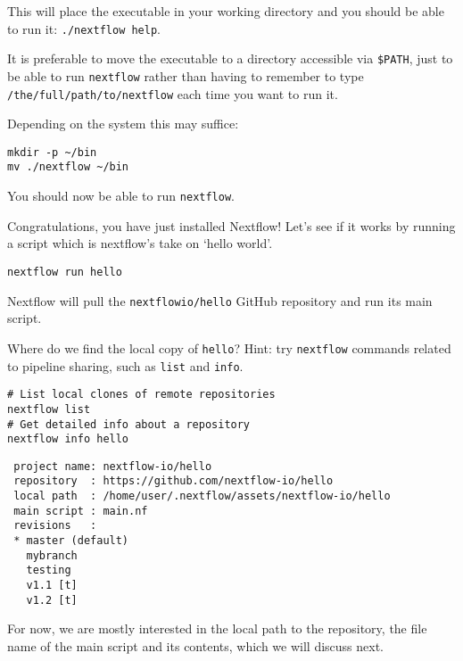 This will place the executable in your working directory and you should be able to run it: \texttt{./nextflow help}.

It is preferable to move the executable to a directory accessible via \texttt{\$PATH}, just to be able to run \texttt{nextflow} rather than having to remember to type \texttt{/the/full/path/to/nextflow} each time you want to run it.

Depending on the system this may suffice:



\begin{steps}
\begin{lstlisting}
mkdir -p ~/bin
mv ./nextflow ~/bin
\end{lstlisting}
\end{steps}

You should now be able to run \texttt{nextflow}.

Congratulations, you have just installed Nextflow! 
Let's see if it works by running a script which is nextflow's take on `hello world'.

\begin{steps}
\begin{lstlisting}
nextflow run hello
\end{lstlisting}
\end{steps}

Nextflow will pull the \texttt{nextflowio/hello} GitHub repository and run its main script.


\begin{questions}
Where do we find the local copy of \texttt{hello}? Hint: try \texttt{nextflow} commands related to pipeline sharing, such as \texttt{list} and \texttt{info}.
\begin{answer}
\begin{lstlisting}
# List local clones of remote repositories
nextflow list
# Get detailed info about a repository 
nextflow info hello
\end{lstlisting}

\begin{verbatim}
 project name: nextflow-io/hello
 repository  : https://github.com/nextflow-io/hello
 local path  : /home/user/.nextflow/assets/nextflow-io/hello
 main script : main.nf
 revisions   : 
 * master (default)
   mybranch
   testing
   v1.1 [t]
   v1.2 [t]
\end{verbatim}
\end{answer}
\end{questions}


For now, we are mostly interested in the local path to the repository, the file name of the main script 
and its contents, which we will discuss next.



